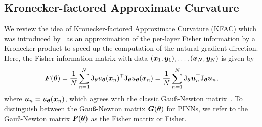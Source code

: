 \subsection{Kronecker-factored Approximate Curvature}


We review the idea of Kronecker-factored Approximate Curvature (KFAC) which was introduced by~\citet{heskes2000natural, martens2015optimizing} as an approximation of the per-layer Fisher information by a Kronecker product to speed up the computation of the natural gradient direction. 
Here, the Fisher information matrix with data $({\bm{x}}_1, {\bm{y}}_1), \dots, ({\bm{x}}_N, {\bm{y}}_N)$ is given by 
\begin{equation}
  {\bm{F}}({\bm{\theta}}) = \frac1N\sum_{n=1}^N \mathrm{J}_{{\bm{\theta}}} u_{{\bm{\theta}}}({\bm{x}}_n)^\top \mathrm{J}_{{\bm{\theta}}} u_{{\bm{\theta}}}({\bm{x}}_n) = \frac1N\sum_{n=1}^N \mathrm{J}_{{\bm{\theta}}} {\bm{u}}_n^\top \mathrm{J}_{{\bm{\theta}}} {\bm{u}}_n
  ,
 \end{equation}
where ${\bm{u}}_n = u_{\bm{\theta}}({\bm{x}}_n)$, which agrees with the %
classic Gauß-Newton matrix~\citep{martens2020new, eschenhagen2023kroneckerfactored}. 
To distinguish between the Gauß-Newton matrix ${\bm{G}}({\bm{\theta}})$ for PINNs, we refer to the Gauß-Newton matrix ${\bm{F}}({\bm{\theta}})$ as the Fisher matrix or Fisher. 


